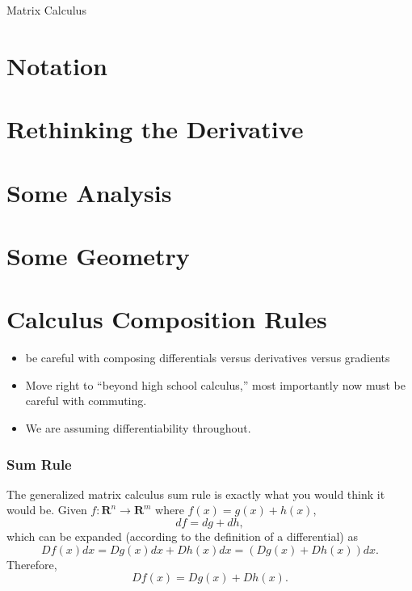\begin{chapter}{Matrix Calculus}


    \section{Notation}
    
    \section{Rethinking the Derivative}

    \section{Some Analysis}


    \section{Some Geometry}
    
    \section{Calculus Composition Rules}
    \begin{itemize}
        \item be careful with composing differentials versus derivatives versus gradients
        \item Move right to ``beyond high school calculus,'' most importantly now must be careful with commuting.
        \item We are assuming differentiability throughout.
    \end{itemize}

    \subsubsection{Sum Rule}
    The generalized matrix calculus sum rule is exactly what you would think it would be. Given
    $f: \mathbf{R}^n \to \mathbf{R}^m$ where $f(x) = g(x) + h(x)$,
    \[df = dg + dh,\]
    which can be expanded (according to the definition of a differential) as 
    \[Df(x)dx = Dg(x)dx + Dh(x)dx = (Dg(x) + Dh(x))dx.\] Therefore,
    \[Df(x) = Dg(x) + Dh(x).\]


\end{chapter}
